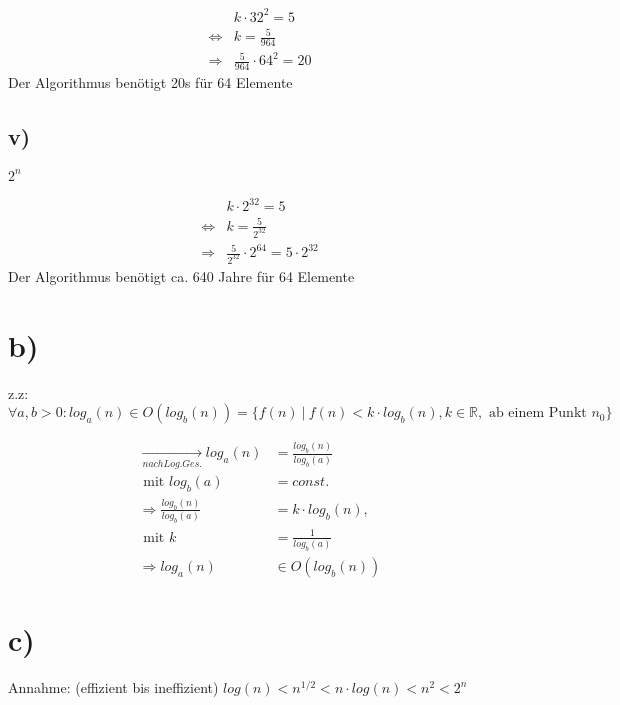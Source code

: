 \documentclass[12pt, a4paper, reqno]{amsart}
\begin{document}
    \begin{align}
    &k\cdot 32^2 = 5\\
    \Leftrightarrow & k = \frac 5 {964} \\
    \Rightarrow & \frac 5 {964} \cdot 64^2 = 20
    \end{align}
    Der Algorithmus benötigt 20s für 64 Elemente
    
    \subsection*{v)} $2^n$
    
    \begin{align}
    &k\cdot 2^{32} = 5\\
    \Leftrightarrow & k = \frac 5 {2^{32}} \\
    \Rightarrow & \frac 5 {2^{32}} \cdot 2^{64} = 5\cdot 2^{32}
    \end{align}
    Der Algorithmus benötigt ca. 640 Jahre für 64 Elemente
    
    
    \section*{b)}
    z.z: $\forall a,b>0: log_a(n) \in O(log_b(n)) = \{ f(n)\ |\ f(n)<k\cdot log_b(n), k\in \mathbb R, \text{ ab einem Punkt } n_0 \}$
    
    \begin{align}
        \xrightarrow[nach Log.Ges.]{} log_a(n)&=\frac{log_b(n)}{log_b(a)}\\
        \text{ mit } log_b(a) &= const.\\
        \Rightarrow \frac{log_b(n)}{log_b(a)} &= k\cdot log_b(n),\\
        \text{ mit } k&=\frac 1 {log_b(a)}\\
        \Rightarrow log_a(n)&\in O(log_b(n))
    \end{align}
    
    \section*{c)}
    Annahme: (effizient bis ineffizient) $log(n) < n^{1/2} < n\cdot log(n) < n^2 < 2^n$
    
\end{document}
